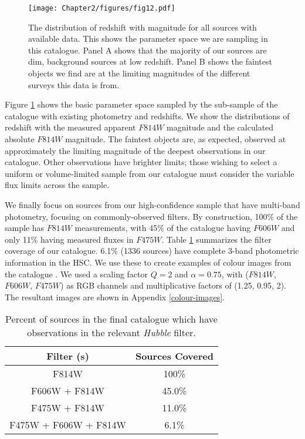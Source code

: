 {\begin{figure}
    \centering
    \texttt{[image: Chapter2/figures/fig12.pdf]}
    \caption[The distribution of redshift with magnitude for all sources with available data.]{The distribution of redshift with magnitude for all sources with available data. This shows the parameter space we are sampling in this catalogue. Panel A shows that the majority of our sources are dim, background sources at low redshift. Panel B shows the faintest objects we find are at the limiting magnitudes of the different surveys this data is from. \DIFaddbeginFL {}\DIFaddendFL }
    \label{fig:redshift-mag-dist}
\end{figure}

Figure \ref{fig:redshift-mag-dist} shows the basic parameter space sampled by the sub-sample of the catalogue with existing photometry and redshifts. We show the distributions of redshift with the measured apparent $F814W$ magnitude and the calculated absolute $F814W$ magnitude. The faintest objects are, as expected, observed at approximately the limiting magnitude of the deepest observations in our catalogue. Other observations have brighter limits; those wishing to select a uniform or volume-limited sample from our catalogue must consider the variable flux limits across the sample.

We finally focus on sources from our high-confidence sample that have multi-band photometry, focusing on commonly-observed filters. By construction, 100\% of the sample has $F814W$ measurements, with 45\% of the catalogue having $F606W$ and only 11\% having measured fluxes in $F475W$. Table \ref{tab:filters-breakdown} summarizes the filter coverage of our catalogue. 6.1\% (1336 sources) have complete 3-band photometric information in the HSC. We use these to create examples of colour images from the catalogue \citep[using the algorithm of][]{2004PASP..116..133L}. We used a scaling factor $Q = 2$ and $\alpha = 0.75$, with ($F814W$, $F606W$, $F475W$) as RGB channels and multiplicative factors of (1.25, 0.95, 2). The resultant images are shown in Appendix \ref{colour-images}.

\begin{table}
\centering
	\begin{tabular}{|c|c|}
	  \hline
	  Filter (s) & Sources Covered \\
	  \hline
	  F814W & 100\% \\
	  F606W + F814W & 45.0\% \\
	  F475W + F814W & 11.0\% \\
	  F475W + F606W + F814W & 6.1\% \\
	  \hline
	\end{tabular}
  \caption{Percent of sources in the final catalogue which have observations in the relevant \emph{Hubble} filter.}
 \label{tab:filters-breakdown}
\end{table}

}
